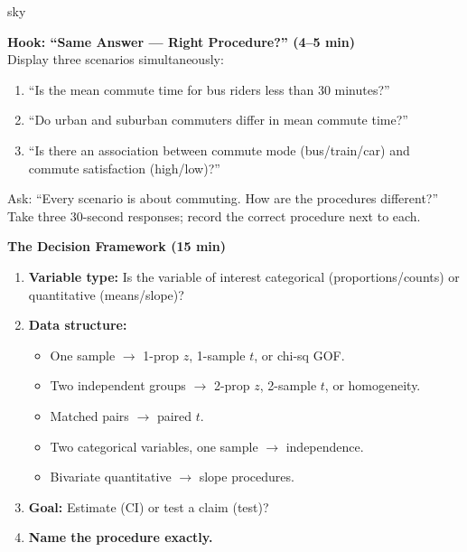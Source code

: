 \documentclass[10pt]{article}
\begin{document}
\begin{skillbox}{sky}
\begin{minipage}[t]{0.48\linewidth}
    \textbf{Hook: ``Same Answer --- Right Procedure?'' (4--5 min)}\\
    Display three scenarios simultaneously:
    \begin{enumerate}
        \item ``Is the mean commute time for bus riders less than 30 minutes?''
        \item ``Do urban and suburban commuters differ in mean commute time?''
        \item ``Is there an association between commute mode (bus/train/car) and
              commute satisfaction (high/low)?''
    \end{enumerate}
    Ask: ``Every scenario is about commuting. How are the procedures different?''
    Take three 30-second responses; record the correct procedure next to each.
\end{minipage}
\hfill
\begin{minipage}[t]{0.48\linewidth}
    \textbf{The Decision Framework (15 min)}
    \begin{enumerate}
        \item \textbf{Variable type:} Is the variable of interest categorical (proportions/counts)
              or quantitative (means/slope)?
        \item \textbf{Data structure:}
              \begin{itemize}
                  \item One sample $\to$ 1-prop $z$, 1-sample $t$, or chi-sq GOF.
                  \item Two independent groups $\to$ 2-prop $z$, 2-sample $t$, or homogeneity.
                  \item Matched pairs $\to$ paired $t$.
                  \item Two categorical variables, one sample $\to$ independence.
                  \item Bivariate quantitative $\to$ slope procedures.
              \end{itemize}
        \item \textbf{Goal:} Estimate (CI) or test a claim (test)?
        \item \textbf{Name the procedure exactly.}
    \end{enumerate}
\end{minipage}
\end{skillbox}
\end{document}
